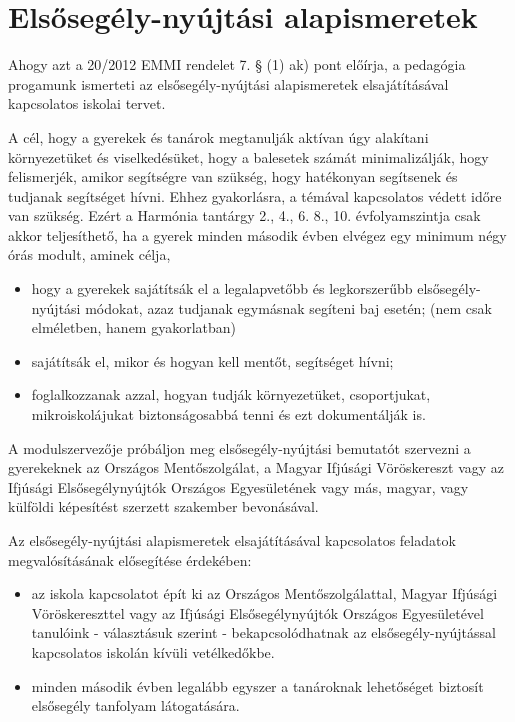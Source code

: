 \section{Elsősegély-nyújtási alapismeretek}
\label{sec:elsosegely}
Ahogy azt a 20/2012 EMMI rendelet 7. § (1) ak) pont előírja, a pedagógia progamunk ismerteti az elsősegély-nyújtási alapismeretek elsajátításával kapcsolatos iskolai tervet.

A cél, hogy a gyerekek és tanárok megtanulják aktívan úgy alakítani környezetüket és viselkedésüket, hogy a balesetek számát minimalizálják, hogy felismerjék, amikor segítségre van szükség, hogy hatékonyan segítsenek és tudjanak segítséget hívni. Ehhez gyakorlásra, a témával kapcsolatos védett időre van szükség. Ezért a Harmónia tantárgy 2., 4., 6. 8., 10. évfolyamszintja csak akkor teljesíthető, ha a gyerek minden második évben elvégez egy minimum négy órás modult, aminek célja,
\begin{itemize}
    \item hogy a gyerekek sajátítsák el a legalapvetőbb és legkorszerűbb elsősegély-nyújtási módokat, azaz tudjanak egymásnak segíteni baj esetén; (nem csak elméletben, hanem gyakorlatban)
    \item sajátítsák el, mikor és hogyan kell mentőt, segítséget hívni;
    \item foglalkozzanak azzal, hogyan tudják környezetüket, csoportjukat, mikroiskolájukat biztonságosabbá tenni és ezt dokumentálják is.
\end{itemize}

A modulszervezője próbáljon meg elsősegély-nyújtási bemutatót szervezni a gyerekeknek az Országos Mentőszolgálat, a Magyar Ifjúsági Vöröskereszt vagy az Ifjúsági Elsősegélynyújtók Országos Egyesületének vagy más, magyar, vagy külföldi képesítést szerzett szakember bevonásával.

Az elsősegély-nyújtási alapismeretek elsajátításával kapcsolatos feladatok megvalósításának elősegítése érdekében:
\begin{itemize}
    \item az iskola kapcsolatot épít ki az Országos Mentőszolgálattal, Magyar Ifjúsági Vöröskereszttel vagy az Ifjúsági Elsősegélynyújtók Országos Egyesületével tanulóink - választásuk szerint - bekapcsolódhatnak az elsősegély-nyújtással kapcsolatos iskolán kívüli vetélkedőkbe.
    \item  minden második évben legalább egyszer a tanároknak lehetőséget biztosít elsősegély tanfolyam látogatására.

\end{itemize}
